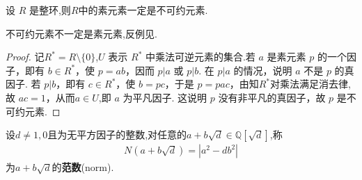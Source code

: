 \documentclass[../../main.tex]{subfiles}%
\begin{document}
\begin{lemma}\label{lemma:交换整环中的素元素必是不可约的}
设 \( R \) 是整环,则$R$中的素元素一定是不可约元素.
\end{lemma}
\begin{remark}
不可约元素不一定是素元素,反例见.
\end{remark}
\begin{proof}
记\( R^* = R \setminus \{0\} \),\( U \) 表示 \( R^* \) 中乘法可逆元素的集合.若 \( a \) 是素元素 \( p \) 的一个因子，即有 \( b \in R^* \)，使 \( p = ab \)，因而 \( p|a \) 或 \( p|b \). 在 \( p|a \) 的情况，说明 \( a \) 不是 \( p \) 的真因子. 若 \( p|b \)，即有 \( c \in R^* \)，使 \( b = pc \)，于是 \( p = pac \)，由知$R^*$对乘法满足消去律,故 \( ac = 1\)，从而$a \in U$,即 \( a \) 为平凡因子. 这说明 \( p \) 没有非平凡的真因子，故 \( p \) 是不可约元素.
\end{proof}

\begin{definition}
设$d \neq 1,0$且为无平方因子的整数,对任意的$a + b\sqrt{d} \in \mathbb{Q}[\sqrt{d}]$,称
\begin{align*}
N(a + b\sqrt{d}) = |a^2 - db^2|
\end{align*}
为$a + b\sqrt{d}$的\textbf{范数}(norm).
\end{definition}
\end{document}
